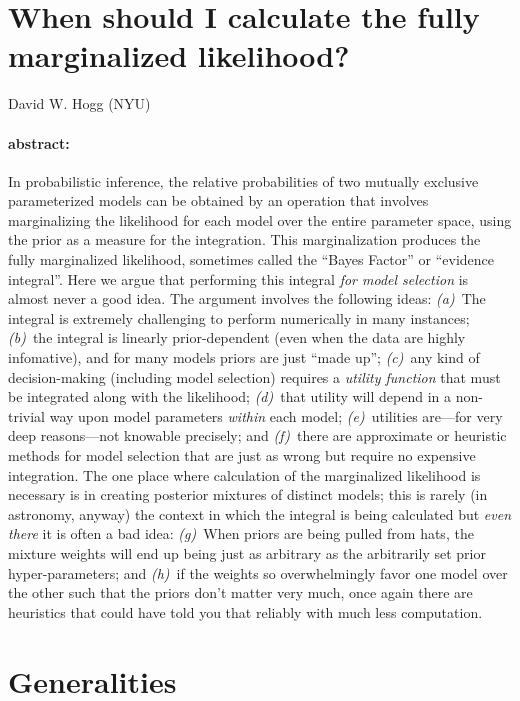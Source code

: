 \documentclass[12pt]{article}
\begin{document}
\section*{When should I calculate the fully marginalized likelihood?}

\noindent
David W. Hogg (NYU)

\paragraph{abstract:}
In probabilistic inference,
  the relative probabilities of two mutually exclusive parameterized models
  can be obtained by an operation that involves marginalizing the likelihood for each model
  over the entire parameter space,
  using the prior as a measure for the integration.
This marginalization produces the fully marginalized likelihood,
  sometimes called the ``Bayes Factor'' or ``evidence integral''.
Here we argue that performing this integral \emph{for model selection}
  is almost never a good idea.
The argument involves the following ideas:
  \textsl{(a)}~The integral is extremely challenging to perform numerically in many instances;
  \textsl{(b)}~the integral is linearly prior-dependent (even when the data are highly infomative),
  and for many models priors are just ``made up'';
  \textsl{(c)}~any kind of decision-making (including model selection) requires a \emph{utility function}
  that must be integrated along with the likelihood;
  \textsl{(d)}~that utility will depend in a non-trivial way upon model parameters \emph{within} each model;
  \textsl{(e)}~utilities are---for very deep reasons---not knowable precisely; and
  \textsl{(f)}~there are approximate or heuristic methods for model selection
  that are just as wrong but require no expensive integration.
The one place where calculation of the marginalized likelihood is necessary
  is in creating posterior mixtures of distinct models;
  this is rarely (in astronomy, anyway) the context in which the integral is being calculated
  but \emph{even there} it is often a bad idea:
  \textsl{(g)}~When priors are being pulled from hats,
  the mixture weights will end up being just as arbitrary as the arbitrarily set prior hyper-parameters; and
  \textsl{(h)}~if the weights so overwhelmingly favor one model over the other
  such that the priors don't matter very much,
  once again there are heuristics that could have told you that reliably with much less computation.

\section{Generalities}
\end{document}
